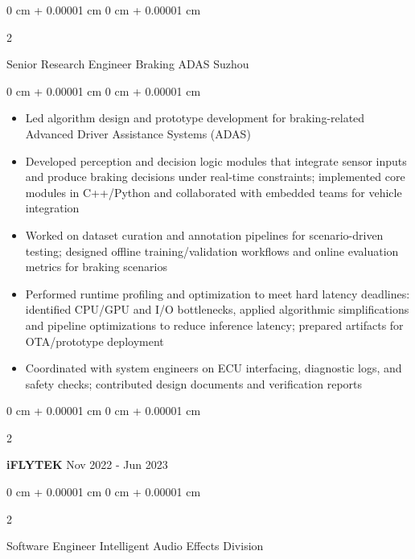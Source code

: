 \documentclass[10pt, a4paper]{article}
\newenvironment{highlights}{
    \begin{itemize}[
        topsep=0.15 cm,
        parsep=0.08 cm,
        partopsep=0pt,
        itemsep=0.05 cm,
        leftmargin=0 cm + 10pt
    ]
}{
    \end{itemize}
} %
\newenvironment{onecolentry}{
    \begin{adjustwidth}{
        0 cm + 0.00001 cm
    }{
        0 cm + 0.00001 cm
    }
}{
    \end{adjustwidth}
} %
\newenvironment{twocolentry}[2][]{
    \onecolentry
    \def\secondColumn{#2}
    \setcolumnwidth{\fill, 4.5 cm}
    \begin{paracol}{2}
}{
    \switchcolumn \raggedleft \secondColumn
    \end{paracol}
    \endonecolentry
} %
\begin{document}
        \begin{twocolentry}{
            Suzhou
        }
            Senior Research Engineer Braking ADAS\end{twocolentry}

        \vspace{0.10 cm}
        \begin{onecolentry}
            \begin{highlights}
                \item Led algorithm design and prototype development for braking-related Advanced Driver Assistance Systems (ADAS)
                \item Developed perception and decision logic modules that integrate sensor inputs and produce braking decisions under real-time constraints; implemented core modules in C++/Python and collaborated with embedded teams for vehicle integration
                \item Worked on dataset curation and annotation pipelines for scenario-driven testing; designed offline training/validation workflows and online evaluation metrics for braking scenarios
                \item Performed runtime profiling and optimization to meet hard latency deadlines: identified CPU/GPU and I/O bottlenecks, applied algorithmic simplifications and pipeline optimizations to reduce inference latency; prepared artifacts for OTA/prototype deployment
                \item Coordinated with system engineers on ECU interfacing, diagnostic logs, and safety checks; contributed design documents and verification reports
            \end{highlights}
        \end{onecolentry}

        \vspace{0.2 cm}

        \begin{twocolentry}{
            Nov 2022 - Jun 2023
        }
            \textbf{iFLYTEK}\end{twocolentry}

        \begin{twocolentry}{
            
        }
            Software Engineer Intelligent Audio Effects Division\end{twocolentry}
\end{document}
